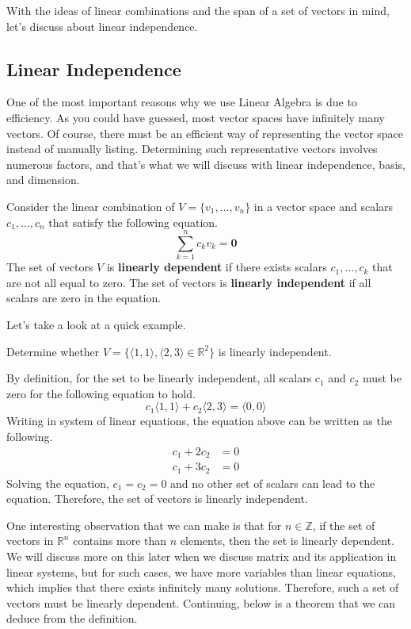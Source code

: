 \documentclass[../../main.tex]{subfiles}
\begin{document}
With the ideas of linear combinations and the span of a set of vectors
in mind, let's discuss about linear independence.

\subsection{Linear Independence}

One of the most important reasons why we use Linear Algebra is due to
efficiency. As you could have guessed, most vector spaces have
infinitely many vectors. Of course, there must be an efficient way
of representing the vector space instead of manually listing.
Determining such representative vectors involves numerous factors,
and that's what we will discuss with linear independence, basis,
and dimension.

\begin{definition}{}{}
Consider the linear combination of $V = \{ v_1, \ldots, v_n \}$
in a vector space and scalars $c_1, \ldots, c_n$ that satisfy the
following equation.
\[
\sum_{k = 1}^n c_k v_k = \mathbf{0}
\]
The set of vectors $V$ is \textbf{linearly dependent} if there exists
scalars $c_1, \ldots, c_k$ that are not all equal to zero. The set of
vectors is \textbf{linearly independent} if all scalars are zero in
the equation.
\end{definition}

Let's take a look at a quick example.

\begin{problem}{}{}
Determine whether $V = \{ \langle 1, 1 \rangle, \langle 2, 3\rangle
\in \mathbb{R}^2 \}$ is linearly independent.
\end{problem}
\begin{solution}
By definition, for the set to be linearly independent, all scalars
$c_1$ and $c_2$ must be zero for the following equation to hold.
\[
c_1 \langle 1, 1 \rangle + c_2 \langle 2, 3 \rangle
= \langle 0, 0 \rangle
\]
Writing in system of linear equations, the equation above can
be written as the following.
\begin{align*}
    c_1 + 2c_2 &= 0 \\
    c_1 + 3c_2 &= 0
\end{align*}
Solving the equation, $c_1 = c_2 = 0$ and no other set of scalars
can lead to the equation. Therefore, the set of vectors is linearly
independent.
\end{solution}

One interesting observation that we can make is that for $n \in
\mathbb{Z}$, if the set of vectors in $\mathbb{R}^n$ contains more
than $n$ elements, then the set is linearly dependent. We will
discuss more on this later when we discuss matrix and its application
in linear systems, but for such cases, we have more variables than
linear equations, which implies that there exists infinitely many
solutions. Therefore, such a set of vectors must be linearly
dependent. Continuing, below is a theorem that we can deduce from
the definition.
\end{document}
